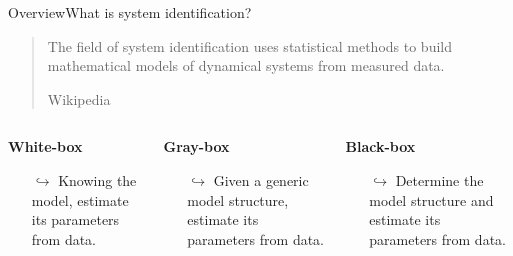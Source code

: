 \documentclass[usenames,dvipsnames,svgnames,10pt,aspectratio=169]{beamer}
\begin{document}
\begin{frame}[t, c]{Overview}{What is system identification?}

		\centering

		\begin{quote}
			The field of system identification uses statistical methods to build mathematical models of dynamical systems from measured data.
			\\
			\begin{flushright}Wikipedia\end{flushright}
		\end{quote}

		\bigskip

		\begin{columns}
			\begin{column}{.3\textwidth}
			\begin{block}{\centering \bf White-box}
				\begin{itemize}
					\item[$\hookrightarrow$] Knowing the model, estimate its parameters from data.\\
					\vspace{.125cm}
				\end{itemize}
			\end{block}
			\end{column}
			\begin{column}{.3\textwidth}
			\begin{block}{\centering \bf Gray-box}
				\begin{itemize}
					\item[$\hookrightarrow$] Given a generic model structure, estimate its parameters from data.
				\end{itemize}
			\end{block}
			\end{column}
			\begin{column}{.3\textwidth}
			\begin{block}{\centering \bf Black-box}
				\begin{itemize}
					\item[$\hookrightarrow$] Determine the model structure and estimate its parameters from data.
				\end{itemize}
			\end{block}
			\end{column}
		\end{columns}

\end{frame}
\end{document}
